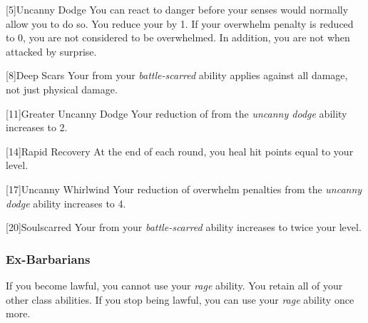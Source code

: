             [5]{Uncanny Dodge} You can react to danger before your senses would normally allow you to do so.
            You reduce your  by 1.
            If your overwhelm penalty is reduced to 0, you are not considered to be overwhelmed.
            In addition, you are not \unaware when attacked by surprise.

            [8]{Deep Scars} Your  from your \textit{battle-scarred} ability applies against all damage, not just physical damage.

            [11]{Greater Uncanny Dodge}
            Your reduction of  from the \textit{uncanny dodge} ability increases to 2.

            [14]{Rapid Recovery}
            At the end of each round, you heal hit points equal to your level.

            [17]{Uncanny Whirlwind}
            Your reduction of overwhelm penalties from the \textit{uncanny dodge} ability increases to 4.

            [20]{Soulscarred}
            Your  from your \textit{battle-scarred} ability increases to twice your level.

        \subsubsection{Ex-Barbarians}
            If you become lawful, you cannot use your \textit{rage} ability.
            You retain all of your other class abilities.
            If you stop being lawful, you can use your \textit{rage} ability once more.

